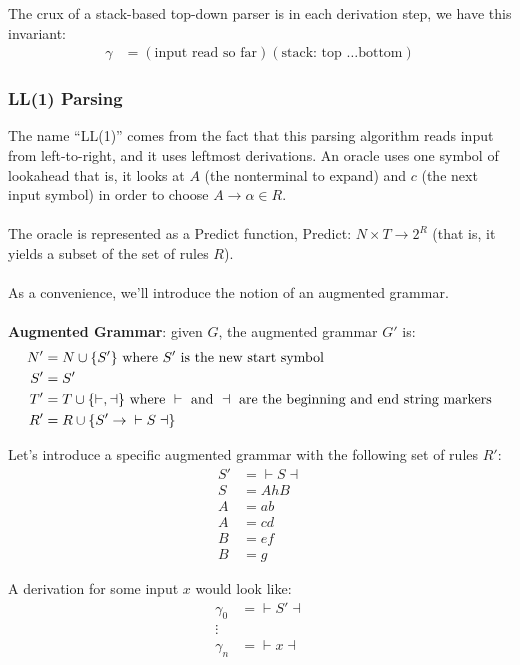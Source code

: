 \documentclass[]{article}
\DeclarePairedDelimiter{\set}{\lbrace}{\rbrace}
\theoremstyle{definition}
\newcommand{\lecture}[1]{\marginpar{{\footnotesize $\leftarrow$ \underline{#1}}}}
\begin{document}
				\lecture{March 4, 2013}
				The crux of a stack-based top-down parser is in each derivation step, we have this invariant:
				\begin{align*}
					\gamma &= (\text{input read so far}) (\text{stack: top \ldots bottom})
				\end{align*}

			\subsubsection{LL(1) Parsing}
				The name ``LL(1)'' comes from the fact that this parsing algorithm reads input from left-to-right, and it uses leftmost derivations. An oracle uses one symbol of lookahead \textendash{} that is, it looks at $A$ (the nonterminal to expand) and $c$ (the next input symbol) in order to choose $A \to \alpha \in R$.
				\\ \\
				The oracle is represented as a Predict function, Predict: $N \times T \to 2^R$ (that is, it yields a subset of the set of rules $R$).
				\\ \\
				As a convenience, we'll introduce the notion of an augmented grammar.
				\\ \\
				\textbf{Augmented Grammar}: given $G$, the augmented grammar $G'$ is:
				\begin{align*}
					N' &= N \cup \set{S'} \text{ where } S' \text{ is the new start symbol} \\
					S' &= S' \\
					T' &= T \cup \set{\vdash, \dashv} \text{ where } \vdash \text{ and } \dashv \text{ are the beginning and end string markers} \\
					R' &= R \cup \set{S' \to{} \vdash S \dashv}
				\end{align*}

				Let's introduce a specific augmented grammar with the following set of rules $R'$:
				\setcounter{equation}{0}
				\begin{align}
					S' &={} \vdash S \dashv \\
					S &= AhB \\
					A &= ab \\
					A &= cd \\
					B &= ef \\
					B &= g
				\end{align}

				A derivation for some input $x$ would look like:
				\begin{align*}
					\gamma_0 &={} \vdash S' \dashv \\
					\vdots& \\
					\gamma_n &={} \vdash x \dashv
				\end{align*}
\end{document}
